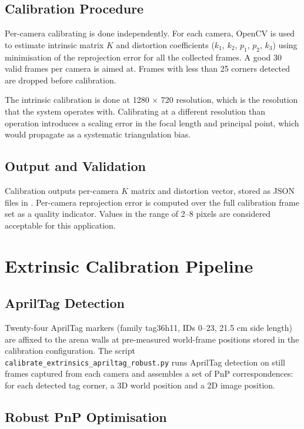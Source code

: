 \subsection{Calibration Procedure}

Per-camera calibrating is done independently. For each camera, OpenCV \cite{ref27} is used to estimate intrinsic matrix $K$ and distortion coefficients ($k_1$, $k_2$, $p_1$, $p_2$, $k_3$) using minimisation of the reprojection error for all the collected frames. A good 30 valid frames per camera is aimed at. Frames with less than 25 corners detected are dropped before calibration.

The intrinsic calibration is done at 1280 $\times$ 720 resolution, which is the resolution that the system operates with. Calibrating at a different resolution than operation introduces a scaling error in the focal length and principal point, which would propagate as a systematic triangulation bias.

\subsection{Output and Validation}

Calibration outputs per-camera $K$ matrix and distortion vector, stored as JSON files in . Per-camera reprojection error is computed over the full calibration frame set as a quality indicator. Values in the range of 2--8 pixels are considered acceptable for this application.

\section{Extrinsic Calibration Pipeline}

\subsection{AprilTag Detection}

Twenty-four AprilTag markers (family tag36h11, IDs 0--23, 21.5 cm side length) are affixed to the arena walls at pre-measured world-frame positions stored in the calibration configuration. The script \texttt{calibrate\_extrinsics\_apriltag\_robust.py} runs AprilTag detection on still frames captured from each camera and assembles a set of PnP correspondences: for each detected tag corner, a 3D world position and a 2D image position.

\subsection{Robust PnP Optimisation}

